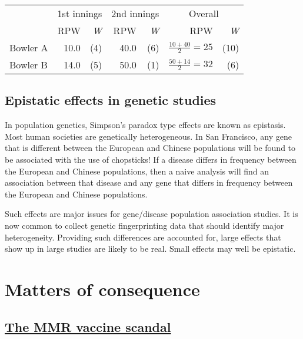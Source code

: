 \documentclass[
  10ptls,
  b5paper]{book}
\begin{document}
\vspace*{-5pt}

\begin{center}
\begin{tabular}{lrr||rr||rr}
\hline
 & \multicolumn{2}{c}{1st innings} & \multicolumn{2}{c}{2nd innings} &
\multicolumn{2}{c}{Overall} \\
\cline{2-3} \cline{4-5} \cline{6-7}
         &  RPW & {\em W}   &  RPW & {\em W} &
           RPW & {\em W} \\[4pt]
Bowler A &  10.0 & (4) & 40.0 & (6)  &
$\frac{10+40}{2} = 25$ & (10)\\[4pt]
Bowler B & 14.0 & (5)  & 50.0 & (1) & $\frac{50+14}{2} = 32$  &  (6)\\[4pt]
\cline{2-3} \cline{4-5} \cline{6-7}
\end{tabular}
\end{center}

\hypertarget{epistatic-effects-in-genetic-studies}{%
\section{Epistatic effects in genetic studies}\label{epistatic-effects-in-genetic-studies}}

In population genetics, Simpson's paradox type effects are known as epistasis. Most human societies are genetically heterogeneous. In San Francisco, any gene that is different between the European and Chinese populations will be found to be associated with the use of chopsticks! If a disease differs in frequency between the European and Chinese populations, then a naive analysis will find an association between that disease and any gene that differs in frequency between the European and Chinese populations.

Such effects are major issues for gene/disease population association studies. It is now common to collect genetic fingerprinting data that should identify major heterogeneity. Providing such differences are accounted for, large effects that show up in large studies are likely to be real. Small effects may well be epistatic.

\hypertarget{matters-of-consequence}{%
\chapter{Matters of consequence}\label{matters-of-consequence}}

\hypertarget{the-mmr-vaccine-scandal}{%
\section{\texorpdfstring{\href{https://en.wikipedia.org/wiki/MMR_vaccine_controversy}{The MMR vaccine scandal}}{The MMR vaccine scandal}}\label{the-mmr-vaccine-scandal}}
\end{document}
